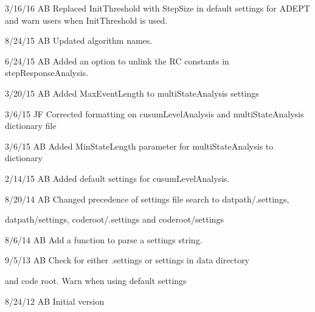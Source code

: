\documentclass[letterpaper,10pt,english]{sphinxmanual}
\begin{document}
\begin{DUlineblock}{0em}
\item[] 3/16/16         AB      Replaced InitThreshold with StepSize in default settings for ADEPT and warn users when InitThreshold is used.
\item[] 8/24/15         AB      Updated algorithm names.
\item[] 6/24/15         AB      Added an option to unlink the RC constants in stepResponseAnalysis.
\item[] 3/20/15         AB      Added MaxEventLength to multiStateAnalysis settings
\item[] 3/6/15          JF      Corrected formatting on cusumLevelAnalysis and multiStateAnalysis dictionary file
\item[] 3/6/15          AB      Added MinStateLength parameter for multiStateAnalysis to dictionary
\item[] 2/14/15         AB      Added default settings for cusumLevelAnalysis.
\item[] 8/20/14         AB      Changed precedence of settings file search to datpath/.settings,
\item[]
\begin{DUlineblock}{\DUlineblockindent}
\item[] datpath/settings, coderoot/.settings and coderoot/settings
\end{DUlineblock}
\item[] 8/6/14          AB      Add a function to parse a settings string.
\item[] 9/5/13          AB      Check for either .settings or settings in data directory
\item[]
\begin{DUlineblock}{\DUlineblockindent}
\item[] and code root. Warn when using default settings
\end{DUlineblock}
\item[] 8/24/12         AB      Initial version
\end{DUlineblock}
\end{document}
